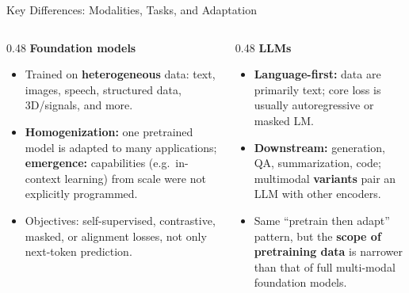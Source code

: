 \begin{frame}{Key Differences: Modalities, Tasks, and Adaptation}
  \begin{columns}[T,onlytextwidth]
    \begin{column}{0.48\textwidth}
      \textbf{Foundation models}
      \begin{itemize}\footnotesize
        \item Trained on \textbf{heterogeneous} data: text, images, speech, structured data, 3D/signals, and more.
        \item \textbf{Homogenization:} one pretrained model is adapted to many applications; \textbf{emergence:} capabilities (e.g.\ in-context learning) from scale were not explicitly programmed.
        \item Objectives: self-supervised, contrastive, masked, or alignment losses, not only next-token prediction.
      \end{itemize}
    \end{column}
    \begin{column}{0.48\textwidth}
      \textbf{LLMs}
      \begin{itemize}\footnotesize
        \item \textbf{Language-first:} data are primarily text; core loss is usually autoregressive or masked LM.
        \item \textbf{Downstream:} generation, QA, summarization, code; multimodal \textbf{variants} pair an LLM with other encoders.
        \item Same ``pretrain then adapt'' pattern, but the \textbf{scope of pretraining data} is narrower than that of full multi-modal foundation models.
      \end{itemize}
    \end{column}
  \end{columns}
  \vspace{0.2cm}
\end{frame}

